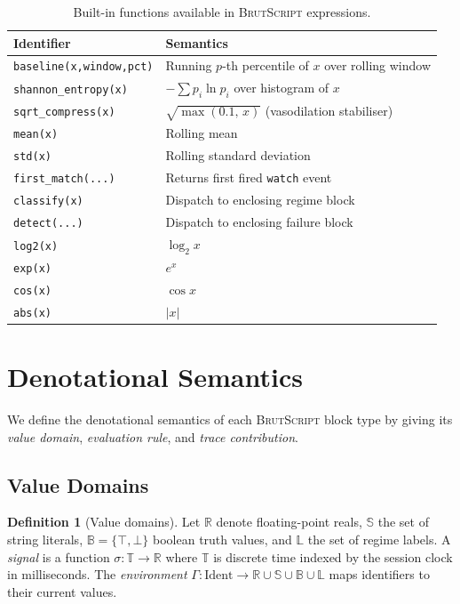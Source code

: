 \documentclass[10pt,twocolumn,a4paper]{article}
\theoremstyle{definition}
\newtheorem{definition}[theorem]{Definition}
\theoremstyle{remark}
\newcommand{\BS}{\textsc{BrutScript}}
\begin{document}
\begin{table}[H]
\centering
\caption{Built-in functions available in \BS{} expressions.}
\label{tab:builtins}
\footnotesize
\begin{tabularx}{\columnwidth}{lX}
\toprule
\textbf{Identifier} & \textbf{Semantics} \\
\midrule
\texttt{baseline(x,window,pct)} & Running $p$-th percentile of $x$ over rolling window \\
\texttt{shannon\_entropy(x)}    & $-\sum p_i \ln p_i$ over histogram of $x$ \\
\texttt{sqrt\_compress(x)}      & $\sqrt{\max(0.1,\, x)}$ (vasodilation stabiliser) \\
\texttt{mean(x)}                & Rolling mean \\
\texttt{std(x)}                 & Rolling standard deviation \\
\texttt{first\_match(...)}      & Returns first fired \texttt{watch} event \\
\texttt{classify(x)}            & Dispatch to enclosing regime block \\
\texttt{detect(...)}            & Dispatch to enclosing failure block \\
\texttt{log2(x)}                & $\log_2 x$ \\
\texttt{exp(x)}                 & $e^x$ \\
\texttt{cos(x)}                 & $\cos x$ \\
\texttt{abs(x)}                 & $|x|$ \\
\bottomrule
\end{tabularx}
\end{table}

\section{Denotational Semantics}
\label{sec:semantics}

We define the denotational semantics of each \BS{} block type by giving
its \emph{value domain}, \emph{evaluation rule}, and \emph{trace contribution}.

\subsection{Value Domains}

\begin{definition}[Value domains]
\label{def:domains}
Let $\mathbb{R}$ denote floating-point reals, $\mathbb{S}$ the set of
string literals, $\mathbb{B} = \{\top,\bot\}$ boolean truth values,
and $\mathbb{L}$ the set of regime labels.  A \emph{signal} is a
function $\sigma: \mathbb{T} \to \mathbb{R}$ where $\mathbb{T}$ is
discrete time indexed by the session clock in milliseconds.  The
\emph{environment} $\Gamma: \mathrm{Ident} \to \mathbb{R} \cup \mathbb{S}
\cup \mathbb{B} \cup \mathbb{L}$ maps identifiers to their current values.
\end{definition}
\end{document}
